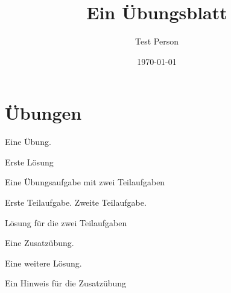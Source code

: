 \documentclass[a4paper]{scrartcl}
\author{Test Person}
\date{\today}
\title{Ein Übungsblatt}
\begin{document}
\section*{\Titel}
\blindtext

\section*{Übungen}
\begin{aufgabe}
    Eine Übung.
\end{aufgabe}
\begin{loesung}
    Erste Lösung
\end{loesung}

\begin{aufgabe}
    \setzeSymbol{\symHaken}
    Eine Übungsaufgabe mit zwei Teilaufgaben
    \begin{teilaufgaben}
        \teilaufgabe Erste Teilaufgabe.
        \teilaufgabe Zweite Teilaufgabe.
    \end{teilaufgaben}
\end{aufgabe}
\begin{loesung}
    Lösung für die zwei Teilaufgaben
\end{loesung}

\begin{aufgabe*}[points=10,bonus-points=5]
    Eine Zusatzübung.
    \begin{loesung*}
        Eine weitere Lösung.
    \end{loesung*}
    \begin{bearbeitungshinweis}
        Ein Hinweis für die Zusatzübung
    \end{bearbeitungshinweis}
\end{aufgabe*}
\end{document}
